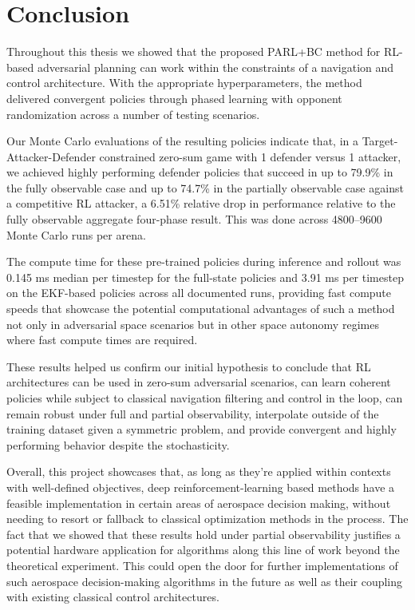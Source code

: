 \chapter{Conclusion}

Throughout this thesis we showed that the proposed PARL+BC method for RL-based adversarial planning can work within the constraints of a navigation and control architecture. With the appropriate hyperparameters, the method delivered convergent policies through phased learning with opponent randomization across a number of testing scenarios.




Our Monte Carlo evaluations of the resulting policies indicate that, in a Target-Attacker-Defender constrained zero-sum game with 1 defender versus 1 attacker, we achieved highly performing defender policies that succeed in up to 79.9\% in the fully observable case and up to 74.7\% in the partially observable case against a competitive RL attacker, a 6.51\% relative drop in performance relative to the fully observable aggregate four-phase result. This was done across 4800--9600 Monte Carlo runs per arena.

The compute time for these pre-trained policies during inference and rollout was 0.145 ms median per timestep for the full-state policies and 3.91 ms per timestep on the EKF-based policies across all documented runs, providing fast compute speeds that showcase the potential computational advantages of such a method not only in adversarial space scenarios but in other space autonomy regimes where fast compute times are required.

These results helped us confirm our initial hypothesis to conclude that RL architectures can be used in zero-sum adversarial scenarios, can learn coherent policies while subject to classical navigation filtering and control in the loop, can remain robust under full and partial observability, interpolate outside of the training dataset given a symmetric problem, and provide convergent and highly performing behavior despite the stochasticity.


Overall, this project showcases that, as long as they're applied within contexts with well-defined objectives, deep reinforcement-learning based methods have a feasible implementation in certain areas of aerospace decision making, without needing to resort or fallback to classical optimization methods in the process. The fact that we showed that these results hold under partial observability justifies a potential hardware application for algorithms along this line of work beyond the theoretical experiment. This could open the door for further implementations of such aerospace decision-making algorithms in the future as well as their coupling with existing classical control architectures.
